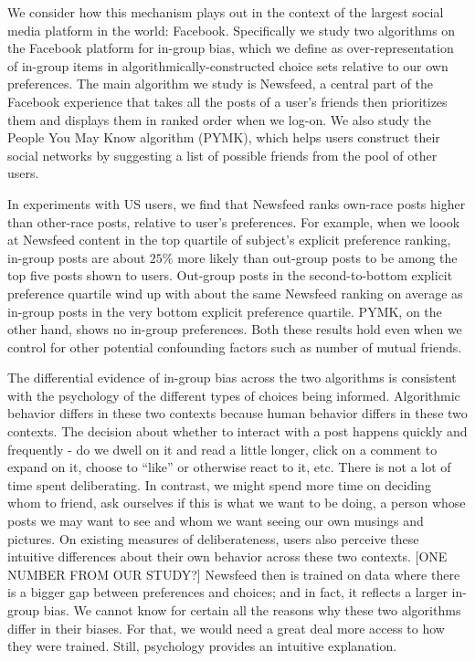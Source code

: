\documentclass[12pt,letterpaper]{article}
\begin{document}
We consider how this mechanism plays out in the context of the largest social media platform in the world: Facebook. Specifically we study two algorithms on the Facebook platform for in-group bias, which we define as over-representation of in-group items in algorithmically-constructed choice sets relative to our own preferences. The main algorithm we study is Newsfeed, a central part of the Facebook experience that takes all the posts of a user's friends then prioritizes them and displays them in ranked order when we log-on. We also study the People You May Know algorithm (PYMK), which helps users construct their social networks by suggesting a list of possible friends from the pool of other users. 

In experiments with US users, we find that Newsfeed ranks own-race posts higher than other-race posts, relative to user's preferences. For example, when we loook at Newsfeed content in the top quartile of subject's explicit preference ranking, in-group posts are about $25\%$ more likely than out-group posts to be among the top five posts shown to users. Out-group posts in the second-to-bottom explicit preference quartile wind up with about the same Newsfeed ranking on average as in-group posts in the very bottom explicit preference quartile. PYMK, on the other hand, shows no in-group preferences. Both these results hold even when we control for other potential confounding factors such as number of mutual friends. 

The differential evidence of in-group bias across the two algorithms is consistent with the psychology of the different types of choices being informed. Algorithmic behavior differs in these two contexts because human behavior differs in these two contexts. The decision about whether to interact with a post happens quickly and frequently - do we dwell on it and read a little longer, click on a comment to expand on it, choose to ``like'' or otherwise react to it, etc. There is not a lot of time spent deliberating. In contrast, we might spend more time on deciding whom to friend, ask ourselves if this is what we want to be doing, a person whose posts we may want to see and whom we want seeing our own musings and pictures. On existing measures of deliberateness, users also perceive these intuitive differences about their own behavior across these two contexts. [ONE NUMBER FROM OUR STUDY?] Newsfeed then is trained on data where there is a bigger gap between preferences and choices; and in fact, it reflects a larger in-group bias. We cannot know for certain all the reasons why these two algorithms differ in their biases. For that, we would need a great deal more access to how they were trained. Still, psychology provides an intuitive explanation. 
\end{document}
